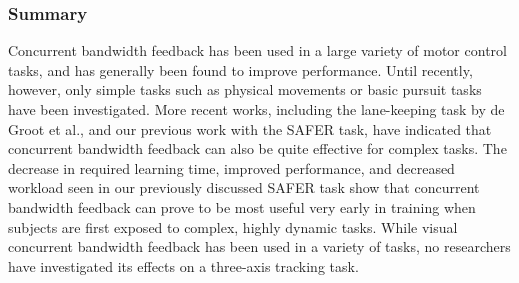 
\subsubsection{Summary}
Concurrent bandwidth feedback has been used in a large variety of motor control tasks, and has generally been found to improve performance.
Until recently, however, only simple tasks such as physical movements or basic pursuit tasks have been investigated.
More recent works, including the lane-keeping task by de Groot et al., and our previous work with the SAFER task, have indicated that concurrent bandwidth feedback can also be quite effective for complex tasks.
The decrease in required learning time, improved performance, and decreased workload seen in our previously discussed SAFER task show that concurrent bandwidth feedback can prove to be most useful very early in training when subjects are first exposed to complex, highly dynamic tasks.
While visual concurrent bandwidth feedback has been used in a variety of tasks, no researchers have investigated its effects on a three-axis tracking task.

